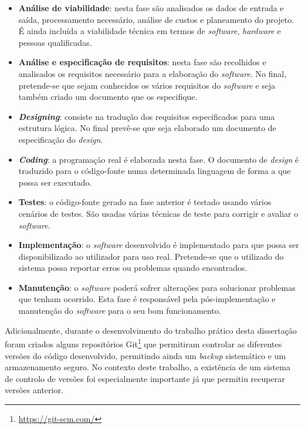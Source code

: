 \begin{itemize}
	\item \textbf{Análise de viabilidade}: nesta fase são analisados os dados de entrada e saída, processamento necessário, análise de custos e planeamento do projeto. É ainda incluída a viabilidade técnica em termos de \textit{software}, \textit{hardware} e pessoas qualificadas. 
	
	\item \textbf{Análise e especificação de requisitos}: nesta fase são recolhidos e analisados os requisitos necessário para a elaboração do \textit{software}. No final, pretende-se que sejam conhecidos os vários requisitos do \textit{software} e seja também criado um documento que os especifique. 
	
	\item  \textbf{\textit{Designing}}: consiste na tradução dos requisitos especificados para uma estrutura lógica. No final prevê-se que seja elaborado um documento de especificação do \textit{design}. 
	
	
	\item  \textbf{\textit{Coding}}: a programação real é elaborada nesta fase. O documento de \textit{design} é traduzido para o código-fonte numa determinada linguagem de forma a que possa ser executado. 
	
	\item \textbf{Testes}: o código-fonte gerado na fase anterior é testado usando vários cenários de testes. São usadas várias técnicas de teste para corrigir e avaliar o \textit{software}. 
	
	\item  \textbf{Implementação}: o \textit{software} desenvolvido é implementado para que possa ser disponibilizado ao utilizador para uso real. Pretende-se que o utilizado do sistema possa reportar erros ou problemas quando encontrados. 
	
	\item  \textbf{Manutenção}: o \textit{software} poderá sofrer alterações para solucionar problemas que tenham ocorrido. Esta fase é responsável pela pós-implementação e manutenção do \textit{software} para o seu bom funcionamento.
	
\end{itemize}


Adicionalmente, durante o desenvolvimento do trabalho prático desta dissertação foram criados alguns repositórios Git\footnote{\url{https://git-scm.com/}} que permitiram controlar as diferentes versões do código desenvolvido, permitindo ainda um \textit{backup} sistemático e um armazenamento seguro. No contexto deste trabalho, a existência de um sistema de controlo de versões foi especialmente importante já que permitiu recuperar versões anterior. 









